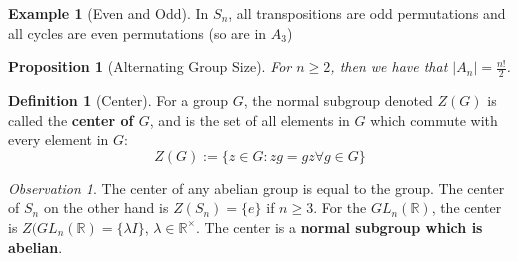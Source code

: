 \documentclass[12pt]{article}
\newtheorem{prop}[thm]{Proposition}
\theoremstyle{definition}
\newtheorem{defn}[thm]{Definition}
\newtheorem{eg}[thm]{Example}
\theoremstyle{remark}
\newtheorem{obs}[thm]{Observation}
\numberwithin{equation}{section}
\newcommand\R{\mathbb R}    %
\newcommand\B[1]{\textbf{ #1}}
\begin{document}
\vspace{15pt}


\begin{eg}[Even and Odd]
        In $S_n$, all transpositions are odd permutations and all cycles are even permutations (so are in $A_3$)
\end{eg}



\vspace{15pt}

\begin{prop}[Alternating Group Size]
        For $n \geq 2$, then we have that $|A_n| = \frac{n!}{2}$.
\end{prop}


\vspace{15pt}


\begin{defn}[Center]
        For a group $G$, the normal subgroup denoted $Z(G)$ is called the \B{center of $G$}, and is the set of all elements in $G$ which commute with every element in $G$: \begin{equation}
                Z(G) := \{z \in G: zg = gz \forall g \in G\}
        \end{equation}
\end{defn}

\begin{obs}
        The center of any abelian group is equal to the group. The center of $S_n$ on the other hand is $Z(S_n) = \{e\}$ if $n \geq 3$. For the $GL_n(\R)$, the center is $Z(GL_n(\R) = \{\lambda I\}$, $\lambda \in \R^{\times}$. The center is a \B{normal subgroup which is abelian}.
\end{obs}


\vspace{15pt}
\end{document}
